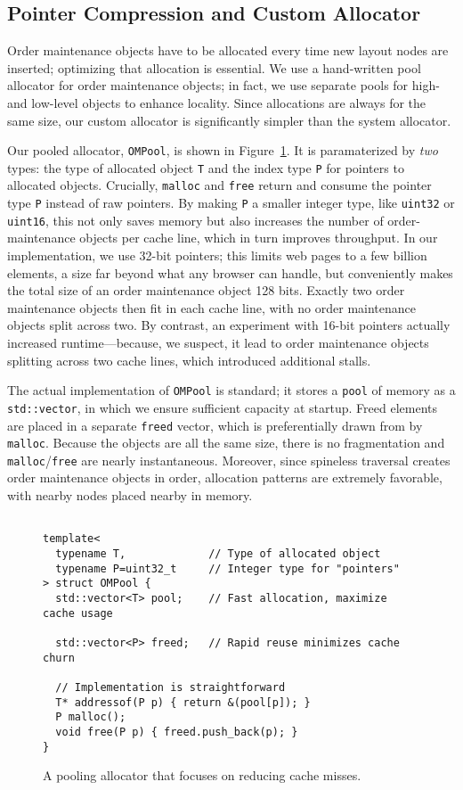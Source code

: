 \subsection{Pointer Compression and Custom Allocator}
Order maintenance objects have to be allocated every time
  new layout nodes are inserted;
  optimizing that allocation is essential.
We use a hand-written pool allocator for order maintenance objects;
  in fact, we use separate pools for high- and low-level objects
  to enhance locality.
Since allocations are always for the same size,
  our custom allocator is significantly simpler than the system allocator.

Our pooled allocator, \texttt{OMPool},
  is shown in Figure~\ref{fig:allocator}.
It is paramaterized by \emph{two} types:
  the type of allocated object \texttt{T}
  and the index type \texttt{P} for pointers to allocated objects.
Crucially,
  \texttt{malloc} and \texttt{free} return and consume
  the pointer type \texttt{P} instead of raw pointers.
By making \texttt{P} a smaller integer type,
  like \texttt{uint32} or \texttt{uint16}, this not only saves memory but also increases
  the number of order-maintenance objects per cache line,
  which in turn improves throughput.
In our implementation, we use 32-bit pointers;
  this limits web pages to a few billion elements,
  a size far beyond what any browser can handle,
  but conveniently makes the total size
  of an order maintenance object 128 bits.
Exactly two order maintenance objects
  then fit in each cache line,
  with no order maintenance objects split across two.
By contrast, an experiment with 16-bit pointers
  actually increased runtime---because, we suspect,
  it lead to order maintenance objects
  splitting across two cache lines,
  which introduced additional stalls.

The actual implementation of \texttt{OMPool} is standard;
  it stores a \texttt{pool} of memory as a \texttt{std::vector},
  in which we ensure sufficient capacity at startup.
Freed elements are placed in a separate \texttt{freed} vector,
  which is preferentially drawn from by \texttt{malloc}.
Because the objects are all the same size,
  there is no fragmentation and \texttt{malloc}/\texttt{free}
  are nearly instantaneous.
Moreover, since spineless traversal
  creates order maintenance objects in order,
  allocation patterns are extremely favorable,
  with nearby nodes placed nearby in memory.

\begin{figure}
\begin{verbatim}

template<
  typename T,             // Type of allocated object
  typename P=uint32_t     // Integer type for "pointers"
> struct OMPool {
  std::vector<T> pool;    // Fast allocation, maximize cache usage

  std::vector<P> freed;   // Rapid reuse minimizes cache churn
  
  // Implementation is straightforward
  T* addressof(P p) { return &(pool[p]); }
  P malloc();
  void free(P p) { freed.push_back(p); }
}
\end{verbatim}
\caption{A pooling allocator that focuses on reducing cache misses.}
\label{fig:allocator}
\end{figure}

